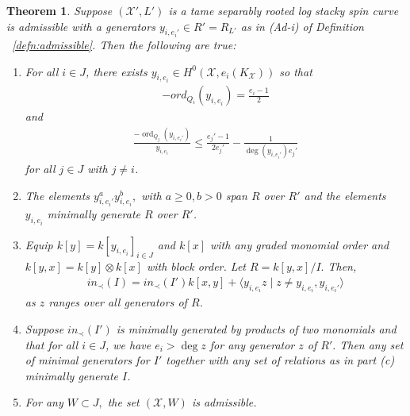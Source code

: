 \documentclass{amsart}
\theoremstyle{plain}
\newtheorem{thm}{Theorem}[section]
\theoremstyle{definition}
\theoremstyle{remark}
\numberwithin{equation}{section}
\newcommand \sx{\mathscr X}
\DeclareMathOperator{\ord}{ord}
\newcommand \subhalf[1]{\frac{{#1} - 1}{2{#1}}}
\begin{document}
\begin{thm}
\label{thm:ramification_order_induction}
Suppose $(\sx',L')$ is a tame separably rooted log stacky spin curve is admissible with a generators $y_{i,e_i'} \in R' = R_{L'}$ as in (Ad-i) of Definition ~\ref{defn:admissible}. Then the following are true:
\begin{enumerate}
	\item[(a)] For all $i \in J$, there exists $y_{i,e_i} \in H^0(\sx, e_i(K_\sx))$ so that
	\begin{align*}
	-ord_{Q_i}(y_{i,e_i}) = \frac{e_i-1}{2}
\end{align*}
and
\begin{align*}
	\frac{-\ord_{Q_j}(y_{i,e_i'})}{y_{i,e_i}} \leq \subhalf{e_j'}-\frac{1}{\deg(y_{i,e_i'})e_j'}
\end{align*}
for all $j \in J$ with $j \neq i$.
\item[(b)] The elements $y_{i,e_i'}^ay_{i,e_i}^b,$ with $a \geq 0, b > 0$ span $R$ over $R'$ and the elements $y_{i,e_i}$ minimally generate $R$ over $R'$.
\item[(c)] Equip $k[y] = k[y_{i,e_i}]_{i \in J}$ and $k[x]$ with any graded monomial order and $k[y,x] = k[y] \otimes k[x]$ with block order. Let $R = k[y,x]/I.$ Then,
\begin{align*}
	in_\prec(I) = in_\prec(I')k[x,y] + \langle y_{i,e_i}z \mid z \neq y_{i,e_i},y_{i,e_i'} \rangle 
\end{align*}
	as $z$ ranges over all generators of $R$.
	\item[(d)] Suppose $in_\prec(I')$ is minimally generated by products of two monomials and that for all $i \in J$, we have $e_i > \deg z$ for any generator $z$ of $R'.$ Then any set of minimal generators for $I'$ together with any set of relations as in part (c) minimally generate $I$.
	\item[(e)] For any $W \subset J,$ the set $(\sx,W)$ is admissible.
\end{enumerate}
\end{thm}
\end{document}
